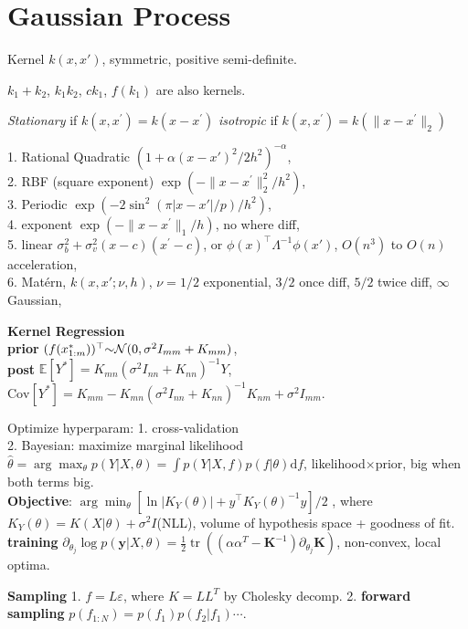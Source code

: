 \section{Gaussian Process}
Kernel $k(x, x')$, symmetric, positive semi-definite. 

 $k_1+k_2$, $k_1 k_2$, $ck_1$, $f(k_1)$ are also kernels.

\textit{Stationary} if $k(x, x^{\prime})=k(x-x^{\prime})$ 
\textit{isotropic} if $k(x, x^{\prime})=k(\|x-x^{\prime}\|_2)$

1. Rational Quadratic  $(1+\alpha (x-x')^2/2h^{2})^{-\alpha}$, \\
2. RBF (square exponent) $\exp (-\|x-x^{\prime}\|_2^2 / h^2)$, \\
3. Periodic $\exp(-2\sin^2(\pi|x-x'|/p)/h^2)$, \\
4. exponent $\exp (-\|x-x^{\prime}\|_1 / h)$, no where diff, \\
5. linear $\sigma_b^2+\sigma_v^2(x-c)(x^{\prime}-c)$, or $\phi(x)^{\top}\Lambda^{-1}\phi(x')$, $O(n^3)$ to $O(n)$ acceleration, \\
6. Matérn, $k(x,x';\nu, h)$, $\nu=1/2$ exponential, $3/2$ once diff, $5/2$ twice diff, $\infty$ Gaussian,  

\textbf{Kernel Regression} \\ 
\textbf{prior}  $(f(x^{*}_{1:m}))^{\top} {\small \sim} \mathcal{N}(0, \sigma^{2} I_{m m} + K_{m m})$, \\
\textbf{post} $\mathbb{E} [Y^*] = K_{m n}(\sigma^{2} I_{n n}+K_{n n})^{-1}Y$, $\mathrm{Cov}[Y^*] = K_{m m} - K_{m n} (\sigma^2  I_{n n} + K_{n n})^{-1} K_{n m}+\sigma^{2}I_{m m}$.

Optimize hyperparam: 1. cross-validation \\
2. Bayesian: maximize marginal likelihood $\hat{\theta}=\arg\max_{\theta} p(Y|X,\theta)=\int p(Y|X,f)p(f|\theta)\mathrm{d}f$, likelihood$\times$prior, big when both terms big. \\
\textbf{Objective}:  $\arg\min_\theta[\ln |K_Y(\theta)|+y^{\top}K_Y(\theta)^{-1}y]/2$ , where $K_Y(\theta)=K(X|\theta)+\sigma^2I$(NLL), volume of hypothesis space + goodness of fit.\\
\textbf{training} $\partial_{\theta_j} \log p(\mathbf{y} | X, \theta)=\frac{1}{2} \operatorname{tr}((\alpha \alpha^T-\mathbf{K}^{-1}) \partial_{\theta_j} \mathbf{K})$, non-convex, local optima.

\textbf{Sampling} 1. $f=L\varepsilon$, where $K=LL^{T}$ by Cholesky decomp. 
2. \textbf{forward sampling} $p(f_{1:N})=p(f_1)p(f_2|f_1)\cdots$.

